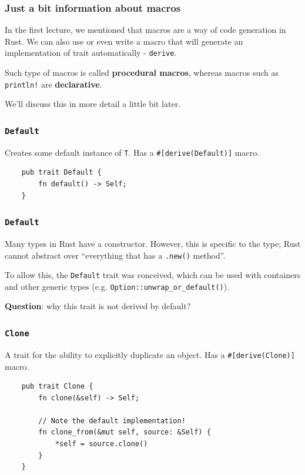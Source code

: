 \documentclass[aspectratio=1610,t]{beamer}
\begin{document}
\begin{frame}[fragile]
\frametitle{Just a bit information about macros}
In the first lecture, we mentioned that macros are a way of code generation in Rust. We can also use or even write a macro that will generate an implementation of trait automatically - \texttt{derive}.

Such type of macros is called \textbf{procedural macros}, whereas macros such as \texttt{println!} are \textbf{declarative}.

We'll discuss this in more detail a little bit later.
\end{frame}


\begin{frame}[fragile]
\frametitle{\texttt{Default}}
Creates some default instance of \texttt{T}. Has a \texttt{\#[derive(Default)]} macro.

\begin{verbatim}
    pub trait Default {
        fn default() -> Self;
    }
\end{verbatim}
\end{frame}


\begin{frame}[fragile]
\frametitle{\texttt{Default}}
Many types in Rust have a constructor. However, this is specific to the type; Rust cannot abstract over  ``everything that has a \texttt{.new()} method''.

To allow this, the \texttt{Default} trait was conceived, which can be used with containers and other generic types (e.g. \texttt{Option::unwrap\_or\_default()}).

\textbf{Question}: why this trait is not derived by default?
\end{frame}


\begin{frame}[fragile]
\frametitle{\texttt{Clone}}
A trait for the ability to explicitly duplicate an object. Has a \texttt{\#[derive(Clone)]} macro.

\begin{verbatim}
    pub trait Clone {
        fn clone(&self) -> Self;

        // Note the default implementation!
        fn clone_from(&mut self, source: &Self) {
            *self = source.clone()
        }
    }
\end{verbatim}
\end{frame}
\end{document}
